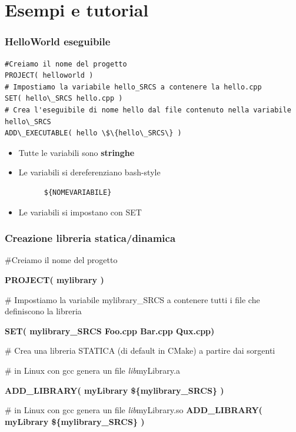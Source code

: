 \documentclass[10pt] {beamer}
\begin{document}

\section{Esempi e tutorial}

\begin{frame}[fragile]
\frametitle{HelloWorld eseguibile}
\begin{verbatim}
#Creiamo il nome del progetto
PROJECT( helloworld )
# Impostiamo la variabile hello_SRCS a contenere la hello.cpp
SET( hello\_SRCS hello.cpp )
# Crea l'eseguibile di nome hello dal file contenuto nella variabile hello\_SRCS
ADD\_EXECUTABLE( hello \$\{hello\_SRCS\} )
\end{verbatim}

\begin{itemize}
	\item Tutte le variabili sono \textbf{stringhe}
	\item Le variabili si dereferenziano bash-style 
	  \begin{verbatim}
	  ${NOMEVARIABILE} 
	  \end{verbatim}
	\item Le variabili si impostano con SET
\end{itemize}

\end{frame}


\begin{frame}
	\frametitle{Creazione libreria statica/dinamica}
\begin{small}
\#Creiamo il nome del progetto

\textbf{PROJECT( mylibrary )}

\# Impostiamo la variabile mylibrary\_SRCS a contenere tutti i file che definiscono la libreria

\textbf{SET( mylibrary\_SRCS Foo.cpp Bar.cpp Qux.cpp)}

\# Crea una libreria STATICA (di default in CMake) a partire dai sorgenti

\# in Linux con gcc genera un file \emph{lib}myLibrary.a

\textbf{ADD\_LIBRARY( myLibrary \$\{mylibrary\_SRCS\} )}

\# in Linux con gcc genera un file \emph{lib}myLibrary.so
\textbf{ADD\_LIBRARY( myLibrary \$\{mylibrary\_SRCS\} )}
\end{small}
\end{frame}
\end{document}
